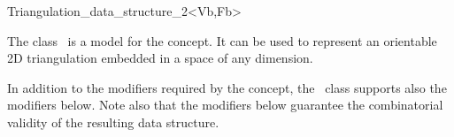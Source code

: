

\begin{ccRefClass}{Triangulation_data_structure_2<Vb,Fb>}  %

\ccDefinition
  
The class \ccRefName\ is a  model
for the  concept.
It can be used to represent an orientable 2D triangulation
embedded in a space of any dimension.


\ccIsModel
{}



In addition to the modifiers required by the
 concept, the \ccRefName\ class
supports also the modifiers below. Note also that the modifiers below
guarantee the combinatorial validity of the resulting data structure.


\end{ccRefClass}

